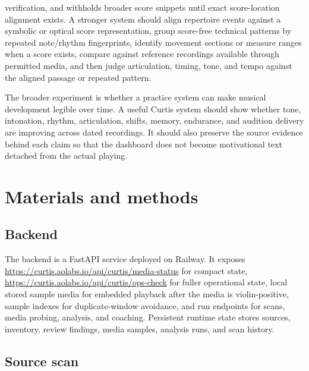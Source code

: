 \documentclass[12pt,letterpaper]{article}
\begin{document}
verification, and withholds broader score snippets until exact score-location alignment exists. A stronger system should align repertoire events against a symbolic or optical score representation, group score-free technical patterns by repeated note/rhythm fingerprints, identify movement sections or measure ranges when a score exists, compare against reference recordings available through permitted media, and then judge articulation, timing, tone, and tempo against the aligned passage or repeated pattern.

The broader experiment is whether a practice system can make musical development legible over time. A useful Curtis system should show whether tone, intonation, rhythm, articulation, shifts, memory, endurance, and audition delivery are improving across dated recordings. It should also preserve the source evidence behind each claim so that the dashboard does not become motivational text detached from the actual playing.



\section{Materials and methods}

\subsection*{Backend}

The backend is a FastAPI service deployed on Railway. It exposes \url{https://curtis.aolabs.io/api/curtis/media-status} for compact state, \url{https://curtis.aolabs.io/api/curtis/ops-check} for fuller operational state, local stored sample media for embedded playback after the media is violin-positive, sample indexes for duplicate-window avoidance, and run endpoints for scans, media probing, analysis, and coaching. Persistent runtime state stores sources, inventory, review findings, media samples, analysis runs, and scan history.

\subsection*{Source scan}
\end{document}

